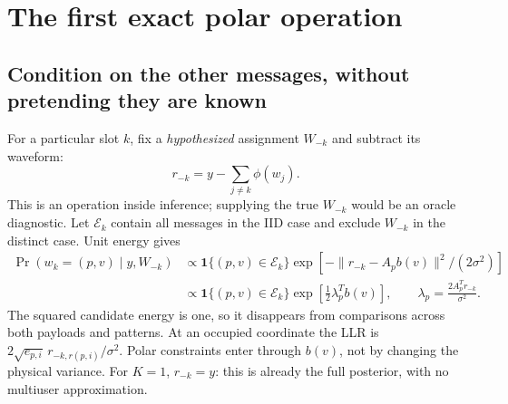 \documentclass[10pt,a4paper]{article}
\newcommand{\ind}{\mathbf 1}
\begin{document}
\clearpage
\section{The first exact polar operation}
\subsection{Condition on the other messages, without pretending they are known}
For a particular slot $k$, fix a \emph{hypothesized} assignment $W_{-k}$ and subtract its waveform:
\begin{equation}
 r_{-k}=y-\sum_{j\ne k}\phi(w_j).
\end{equation}
This is an operation inside inference; supplying the true $W_{-k}$ would be an oracle diagnostic. Let
$\mathcal E_k$ contain all messages in the IID case and exclude $W_{-k}$ in the distinct case. Unit energy gives
\begin{align}
 \Pr(w_k=(p,v)\mid y,W_{-k})
 &\propto\ind\{(p,v)\in\mathcal E_k\}
          \exp[-\|r_{-k}-A_pb(v)\|^2/(2\sigma^2)]\\
 &\propto\ind\{(p,v)\in\mathcal E_k\}
          \exp[\tfrac12\lambda_p^Tb(v)],\qquad
 \boxed{\lambda_p=\frac{2A_p^Tr_{-k}}{\sigma^2}.}
 \label{eq:conditional}
\end{align}
The squared candidate energy is one, so it disappears from comparisons across both payloads and patterns.
At an occupied coordinate the LLR is $2\sqrt{e_{p,i}}\,r_{-k,r(p,i)}/\sigma^2$. Polar constraints enter through
$b(v)$, not by changing the physical variance.
For $K=1$, $r_{-k}=y$: this is already the full posterior, with no multiuser approximation.
\end{document}
